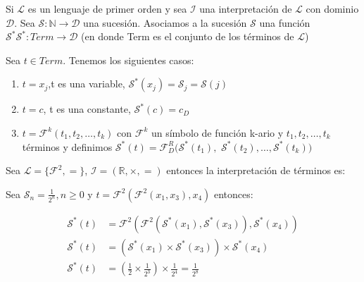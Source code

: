 \begin{definition}

Si $\mathcal{L}$ es un lenguaje de primer orden y sea $\mathcal{I}$ una interpretaci\'on de $\mathcal{L}$ con dominio $\mathcal{D}$. Sea $\mathcal{S} : \mathbb{N} \rightarrow \mathcal{D}$  una sucesi\'on. Asociamos a la sucesi\'on $\mathcal{S}$ una funci\'on $\mathcal{S}^{*}  \mathcal{S}^{*} : Term \rightarrow \mathcal{D}$ (en donde Term es el conjunto de los t\'erminos de $\mathcal{L}$)

Sea $t \in Term$. Tenemos los siguientes casos:

\begin{enumerate}
	\item $t = x_j$,t es una variable, $\mathcal{S}^{*}(x_j) = \mathcal{S}_j = \mathcal{S}(j)$
	\item $t = c$, t es una constante, $\mathcal{S}^{*}(c) = c_D$
	\item $t = \mathcal{F}^k(t_1, t_2, \ldots, t_k)$ con $\mathcal{F}^k$ un s\'imbolo de funci\'on k-ario y $t_1, t_2, \ldots, t_k$ t\'erminos y definimos $\mathcal{S}^{*}(t) = \mathcal{F}^{R}_{D}(\mathcal{S}^{*}(t_1),$ $ \mathcal{S}^{*}(t_2), \ldots, \mathcal{S}^{*}(t_k))$
\end{enumerate}

\end{definition}

\begin{example}

Sea $\mathcal{L} = \{ \mathcal{F}^2, =\}$, $\mathcal{I} = (\mathbb{R}, \times, =)$ entonces la interpretaci\'on de t\'erminos es:

Sea $\mathcal{S}_n = \frac{1}{2^n}, n \geq 0$  y $t = \mathcal{F}^2(\mathcal{F}^2(x_1, x_3), x_4)$ entonces:

\begin{align*}
	\mathcal{S}^{*}(t) &= \mathcal{F}^2(\mathcal{F}^2(\mathcal{S}^{*}(x_1), \mathcal{S}^{*}(x_3)), \mathcal{S}^{*}(x_4))		\\
	\mathcal{S}^{*}(t) &= (\mathcal{S}^{*}(x_1) \times \mathcal{S}^{*}(x_3)) \times \mathcal{S}^{*}(x_4) \\
	\mathcal{S}^{*}(t) &= \left( \frac{1}{2} \times \frac{1}{2^3} \right) \times \frac{1}{2^4} = \frac{1}{2^8}
\end{align*}

\end{example}

